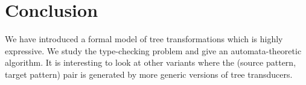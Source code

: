 
\section{Conclusion}\label{sec:conclusion-trees}

We have introduced a formal model of tree transformations which is highly expressive. We study the type-checking problem and give an automata-theoretic algorithm.
It is interesting to look at other variants where the (source pattern, target pattern) pair is generated by more generic versions of tree transducers. 
